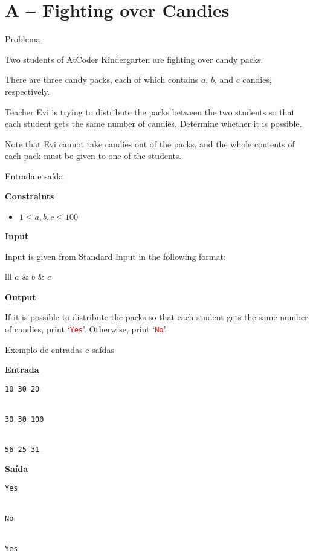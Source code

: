 \section{A -- Fighting over Candies}

\begin{frame}[fragile]{Problema}

Two students of AtCoder Kindergarten are fighting over candy packs.

There are three candy packs, each of which contains $a$, $b$, and $c$ candies, respectively.

Teacher Evi is trying to distribute the packs between the two students so that each student 
gets the same number of candies. Determine whether it is possible.

Note that Evi cannot take candies out of the packs, and the whole contents of each pack must 
be given to one of the students.

\end{frame}

\begin{frame}[fragile]{Entrada e saída}

\textbf{Constraints}

\begin{itemize}
    \item $1\leq a, b, c\leq 100$
\end{itemize}

\vspace{0.1in}

\textbf{Input}

Input is given from Standard Input in the following format:
\begin{atcoderio}{lll}
$a$ & $b$ & $c$ \\
\end{atcoderio}

\textbf{Output}

If it is possible to distribute the packs so that each student gets the same number of candies, 
print `\texttt{\textcolor{red}{Yes}}'. Otherwise, print `\texttt{\textcolor{red}{No}}'.

\end{frame}

\begin{frame}[fragile]{Exemplo de entradas e saídas}

\begin{minipage}[t]{0.45\textwidth}
\textbf{Entrada}
\begin{verbatim}
10 30 20


30 30 100


56 25 31
\end{verbatim}
\end{minipage}
\begin{minipage}[t]{0.5\textwidth}
\textbf{Saída}
\begin{verbatim}
Yes


No


Yes
\end{verbatim}
\end{minipage}
\end{frame}

